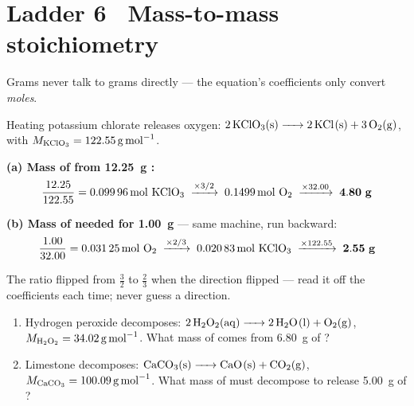 \documentclass{apchem-worksheet}
\begin{document}
\section*{\sffamily Ladder 6 \textbullet\ Mass-to-mass stoichiometry}

\begin{center}
\end{center}

Grams never talk to grams directly --- the equation's coefficients only
convert \emph{moles}.

\begin{workedexample}
Heating potassium chlorate releases oxygen:
$\ce{2KClO3(s) -> 2KCl(s) + 3O2(g)}$, with
$M_{\ce{KClO3}} = \SI{122.55}{\gram\per\mole}$.

\textbf{(a) Mass of  from \SI{12.25}{\gram} :}
\[ \frac{12.25}{122.55} = \SI{0.09996}{\mole}~\ce{KClO3}
   \;\xrightarrow{\times 3/2}\; \SI{0.1499}{\mole}~\ce{O2}
   \;\xrightarrow{\times 32.00}\; \mathbf{4.80~g} \]

\textbf{(b) Mass of  needed for \SI{1.00}{\gram} } ---
same machine, run backward:
\[ \frac{1.00}{32.00} = \SI{0.03125}{\mole}~\ce{O2}
   \;\xrightarrow{\times 2/3}\; \SI{0.02083}{\mole}~\ce{KClO3}
   \;\xrightarrow{\times 122.55}\; \mathbf{2.55~g} \]

The ratio flipped from $\tfrac{3}{2}$ to $\tfrac{2}{3}$ when the direction
flipped --- read it off the coefficients each time; never guess a
direction.
\end{workedexample}

\begin{yourturn}
\begin{enumerate}[leftmargin=*,itemsep=0.35em]
  \item Hydrogen peroxide decomposes:
        $\ce{2H2O2(aq) -> 2H2O(l) + O2(g)}$,
        $M_{\ce{H2O2}} = \SI{34.02}{\gram\per\mole}$. What mass of
         comes from \SI{6.80}{\gram} of ?
        \workspace[2.4cm]
  \item Limestone decomposes: $\ce{CaCO3(s) -> CaO(s) + CO2(g)}$,
        $M_{\ce{CaCO3}} = \SI{100.09}{\gram\per\mole}$. What mass of
         must decompose to release \SI{5.00}{\gram} of
        ? \workspace[2.4cm]
\end{enumerate}
\end{yourturn}
\end{document}
